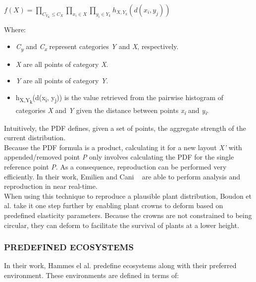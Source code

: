 \begin{center}
$ f(X) = \prod_{C_{Y_{K}} \leq C_{X}} 
		 \prod_{x_{i} \in X}
		 \prod_{y_{i} \in Y_{k}} 
		 h_{X,Y_{k}}(d(x_{i},y_{j}))$
\end{center} 

Where:
\begin{itemize}
\item \textit{C\textsubscript{y}} and \textit{C\textsubscript{x}} represent categories \textit{Y} and \textit{X}, respectively.
\item \textit{X} are all points of category \textit{X}.
\item \textit{Y} are all points of category \textit{Y}.
\item h\textsubscript{X,Y\textsubscript{k}}(d(x\textsubscript{i}, y\textsubscript{j})) is the value retrieved from the pairwise histogram of categories \textit{X} and \textit{Y} given the distance between points \textit{x\textsubscript{i}} and \textit{y\textsubscript{i}}.
\end{itemize}
Intuitively, the PDF defines, given a set of points, the aggregate strength of the current distribution.\\

Because the PDF formula is a product, calculating it for a new layout \textit{X'} with appended/removed point \textit{P} only involves calculating the PDF for the single reference point \textit{P}. As a consequence, reproduction can be performed very efficiently. In their work, Emilien and Cani ~\cite{Emilien} are able to perform analysis and reproduction in near real-time.\\

When using this technique to reproduce a plausible plant distribution, Boudon et al. \cite{Boudon2007} take it one step further by enabling plant crowns to deform based on predefined elasticity parameters. Because the crowns are not constrained to being circular, they can deform to facilitate the survival of plants at a lower height.

\subsubsection{PREDEFINED ECOSYSTEMS}
In their work, Hammes el al. \cite{Hammes2001} predefine ecosystems along with their preferred environment. These environments are defined in terms of:

